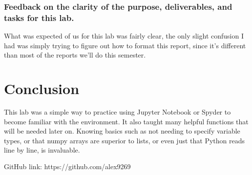 \documentclass[12pt]{report}
\begin{document}
 \subsubsection{Feedback on the clarity of the purpose, deliverables, and tasks for this lab.}
 
 What was expected of us for this lab was fairly clear, the only slight confusion I had was simply trying to figure out how to format this report, since it's different than most of the reports we'll do this semester. 
 
 \section{Conclusion}
 
 This lab was a simple way to practice using Jupyter Notebook or Spyder to become familiar with the environment. It also taught many helpful functions that will be needed later on. Knowing basics such as not needing to specify variable types, or that numpy arrays are superior to lists, or even just that Python reads line by line, is invaluable.
 
 GitHub link: https://github.com/alex9269
\end{document}
